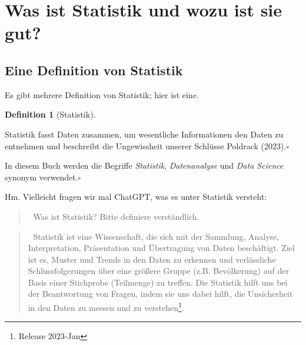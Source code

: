 \documentclass[
  a4paper,
  DIV=11]{scrreprt}
\theoremstyle{definition}
\theoremstyle{definition}
\theoremstyle{definition}
\newtheorem{definition}{Definition}[chapter]
\theoremstyle{remark}
\begin{document}
\section{Was ist Statistik und wozu ist sie
gut?}\label{was-ist-statistik-und-wozu-ist-sie-gut}

\subsection{Eine Definition von
Statistik}\label{eine-definition-von-statistik}

Es gibt mehrere Definition von Statistik; hier ist eine.

\begin{definition}[Statistik]\protect\hypertarget{def-statistik}{}\label{def-statistik}

Statistik fasst Daten zusammen, um wesentliche Informationen den Daten
zu entnehmen und beschreibt die Ungewissheit unserer Schlüsse Poldrack
(2023).\(\square\)

\end{definition}

\begin{tcolorbox}[enhanced jigsaw, toptitle=1mm, rightrule=.15mm, colbacktitle=quarto-callout-note-color!10!white, breakable, title=\textcolor{quarto-callout-note-color}{\faInfo}\hspace{0.5em}{Hinweis}, bottomrule=.15mm, colback=white, opacitybacktitle=0.6, left=2mm, titlerule=0mm, toprule=.15mm, coltitle=black, opacityback=0, bottomtitle=1mm, arc=.35mm, leftrule=.75mm, colframe=quarto-callout-note-color-frame]

In diesem Buch werden die Begriffe \emph{Statistik}, \emph{Datenanalyse}
und \emph{Data Science} synonym verwendet.\(\square\)

\end{tcolorbox}

Hm. Vielleicht fragen wir mal ChatGPT, was es unter Statistik versteht:

\begin{quote}
👨 Was ist Statistik? Bitte definiere verständlich.
\end{quote}

\begin{quote}
🤖 Statistik ist eine Wissenschaft, die sich mit der Sammlung, Analyse,
Interpretation, Präsentation und Übertragung von Daten beschäftigt. Ziel
ist es, Muster und Trends in den Daten zu erkennen und verlässliche
Schlussfolgerungen über eine größere Gruppe (z.B. Bevölkerung) auf der
Basis einer Stichprobe (Teilmenge) zu treffen. Die Statistik hilft uns
bei der Beantwortung von Fragen, indem sie uns dabei hilft, die
Unsicherheit in den Daten zu messen und zu verstehen\footnote{Release
  2023-Jan}.
\end{quote}
\end{document}
